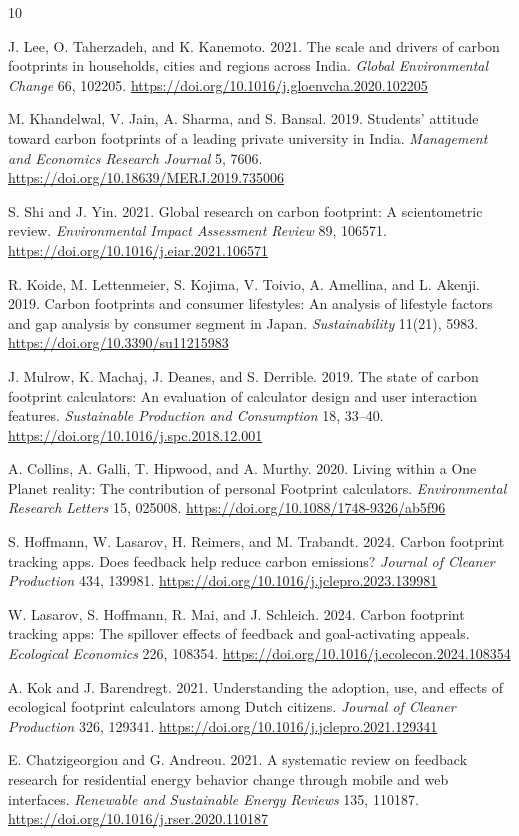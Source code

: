 \documentclass[10pt,a4paper,twocolumn]{article}
\begin{document}
\begin{thebibliography}{10}
\scriptsize
\setlength{\itemsep}{1pt}

J. Lee, O. Taherzadeh, and K. Kanemoto. 2021. The scale and drivers of carbon footprints in households, cities and regions across India. \emph{Global Environmental Change} 66, 102205. \url{https://doi.org/10.1016/j.gloenvcha.2020.102205}

M. Khandelwal, V. Jain, A. Sharma, and S. Bansal. 2019. Students' attitude toward carbon footprints of a leading private university in India. \emph{Management and Economics Research Journal} 5, 7606. \url{https://doi.org/10.18639/MERJ.2019.735006}

S. Shi and J. Yin. 2021. Global research on carbon footprint: A scientometric review. \emph{Environmental Impact Assessment Review} 89, 106571. \url{https://doi.org/10.1016/j.eiar.2021.106571}

R. Koide, M. Lettenmeier, S. Kojima, V. Toivio, A. Amellina, and L. Akenji. 2019. Carbon footprints and consumer lifestyles: An analysis of lifestyle factors and gap analysis by consumer segment in Japan. \emph{Sustainability} 11(21), 5983. \url{https://doi.org/10.3390/su11215983}

J. Mulrow, K. Machaj, J. Deanes, and S. Derrible. 2019. The state of carbon footprint calculators: An evaluation of calculator design and user interaction features. \emph{Sustainable Production and Consumption} 18, 33--40. \url{https://doi.org/10.1016/j.spc.2018.12.001}

A. Collins, A. Galli, T. Hipwood, and A. Murthy. 2020. Living within a One Planet reality: The contribution of personal Footprint calculators. \emph{Environmental Research Letters} 15, 025008. \url{https://doi.org/10.1088/1748-9326/ab5f96}

S. Hoffmann, W. Lasarov, H. Reimers, and M. Trabandt. 2024. Carbon footprint tracking apps. Does feedback help reduce carbon emissions? \emph{Journal of Cleaner Production} 434, 139981. \url{https://doi.org/10.1016/j.jclepro.2023.139981}

W. Lasarov, S. Hoffmann, R. Mai, and J. Schleich. 2024. Carbon footprint tracking apps: The spillover effects of feedback and goal-activating appeals. \emph{Ecological Economics} 226, 108354. \url{https://doi.org/10.1016/j.ecolecon.2024.108354}

A. Kok and J. Barendregt. 2021. Understanding the adoption, use, and effects of ecological footprint calculators among Dutch citizens. \emph{Journal of Cleaner Production} 326, 129341. \url{https://doi.org/10.1016/j.jclepro.2021.129341}

E. Chatzigeorgiou and G. Andreou. 2021. A systematic review on feedback research for residential energy behavior change through mobile and web interfaces. \emph{Renewable and Sustainable Energy Reviews} 135, 110187. \url{https://doi.org/10.1016/j.rser.2020.110187}
\end{thebibliography}
\end{document}
